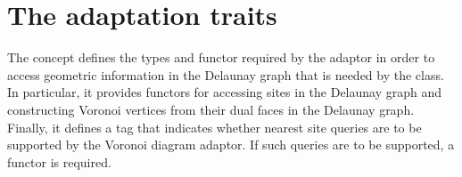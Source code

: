 


\section{The adaptation traits}
\label{sec:vda2-traits}

The  concept defines the types and
functor required by the adaptor in order to access geometric
information in the Delaunay graph that is needed by the
 class.
In particular, it provides functors for accessing sites in the Delaunay
graph and constructing Voronoi vertices from their dual faces in the
Delaunay graph.
Finally, it defines a tag that indicates whether nearest site queries
are to be supported by the Voronoi diagram adaptor. If such queries
are to be supported, a functor is required.


